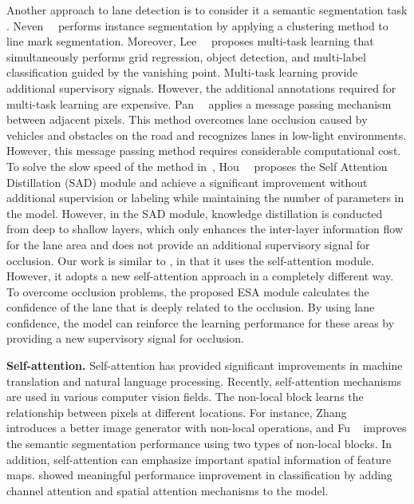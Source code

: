 \documentclass[10pt,twocolumn,letterpaper]{article}
\begin{document}
Another approach to lane detection is to consider it a semantic segmentation task \cite{neven2018towards, pan2017spatial, hou2019learning, hou2020inter, lee2017vpgnet}. Neven~\etal~\cite{neven2018towards} performs instance segmentation by applying a clustering method to line mark segmentation. Moreover, Lee~\etal~\cite{lee2017vpgnet} proposes multi-task learning that simultaneously performs grid regression, object detection, and multi-label classification guided by the vanishing point. Multi-task learning provide additional supervisory signals. However, the additional annotations required for multi-task learning are expensive. Pan~\etal~\cite{pan2017spatial} applies a message passing mechanism between adjacent pixels. This method overcomes lane occlusion caused by vehicles and obstacles on the road and recognizes lanes in low-light environments. However, this message passing method requires considerable computational cost. To solve the slow speed of the method in~\cite{pan2017spatial}, Hou~\etal~\cite{hou2019learning} proposes the Self Attention Distillation (SAD) module and achieve a significant improvement without additional supervision or labeling while maintaining the number of parameters in the model. However, in the SAD module, knowledge distillation is conducted from deep to shallow layers, which only enhances the inter-layer information flow for the lane area and does not provide an additional supervisory signal for occlusion. Our work is similar to \cite{hou2019learning}, in that it uses the self-attention module. However, it adopts a new self-attention approach in a completely different way. To overcome occlusion problems, the proposed ESA module calculates the confidence of the lane that is deeply related to the occlusion. By using lane confidence, the model can reinforce the learning performance for these areas by providing a new supervisory signal for occlusion.

\noindent
\textbf{Self-attention.} Self-attention has provided significant improvements in machine translation and natural language processing. Recently, self-attention mechanisms are used in various computer vision fields. The non-local block \cite{wang2018non} learns the relationship between pixels at different locations. For instance, Zhang \etal~\cite{zhang2019self} introduces a better image generator with non-local operations, and Fu \etal~\cite{fu2019dual} improves the semantic segmentation performance using two types of non-local blocks. In addition, self-attention can emphasize important spatial information of feature maps. \cite{park2018bam, woo2018cbam} showed meaningful performance improvement in classification by adding channel attention and spatial attention mechanisms to the model.
\end{document}
